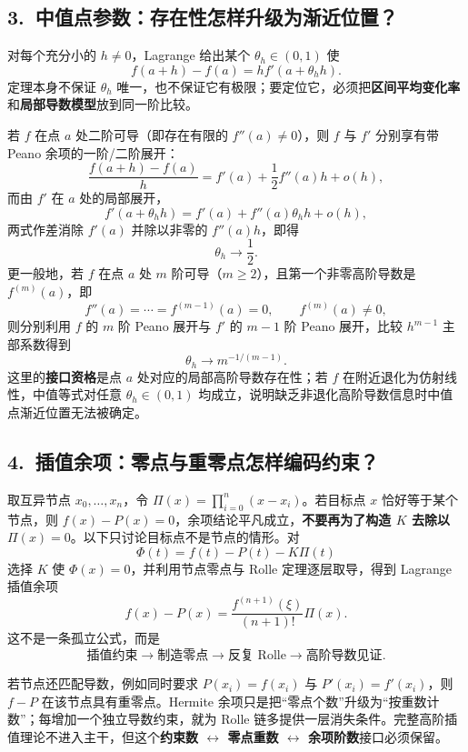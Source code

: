 \documentclass[UTF8,a4paper,10pt]{ctexart}
\begin{document}
\begin{center}

\end{center}

\subsection*{3.\ 中值点参数：存在性怎样升级为渐近位置？}
对每个充分小的 $h\ne0$，Lagrange 给出某个 $\theta_h\in(0,1)$ 使
\[
f(a+h)-f(a)=h f'(a+\theta_h h).
\]
定理本身不保证 $\theta_h$ 唯一，也不保证它有极限；要定位它，必须把\textbf{区间平均变化率}和\textbf{局部导数模型}放到同一阶比较。

若 $f$ 在点 $a$ 处二阶可导（即存在有限的 $f''(a)\ne0$），则 $f$ 与 $f'$ 分别享有带 Peano 余项的一阶/二阶展开：
\[
\frac{f(a+h)-f(a)}h=f'(a)+\frac12f''(a)h+o(h),
\]
而由 $f'$ 在 $a$ 处的局部展开，
\[
f'(a+\theta_hh)=f'(a)+f''(a)\theta_hh+o(h),
\]
两式作差消除 $f'(a)$ 并除以非零的 $f''(a)h$，即得
\[
\boxed{\theta_h\to\frac12}.
\]
更一般地，若 $f$ 在点 $a$ 处 $m$ 阶可导（$m\ge2$），且第一个非零高阶导数是 $f^{(m)}(a)$，即
\[
f''(a)=\cdots=f^{(m-1)}(a)=0,\qquad f^{(m)}(a)\ne0,
\]
则分别利用 $f$ 的 $m$ 阶 Peano 展开与 $f'$ 的 $m-1$ 阶 Peano 展开，比较 $h^{m-1}$ 主部系数得到
\[
\boxed{\theta_h\to m^{-1/(m-1)}}.
\]
这里的\textbf{接口资格}是点 $a$ 处对应的局部高阶导数存在性；若 $f$ 在附近退化为仿射线性，中值等式对任意 $\theta_h\in(0,1)$ 均成立，说明缺乏非退化高阶导数信息时中值点渐近位置无法被确定。

\subsection*{4.\ 插值余项：零点与重零点怎样编码约束？}
取互异节点 $x_0,\ldots,x_n$，令 $\Pi(x)=\prod_{i=0}^{n}(x-x_i)$。若目标点 $x$ 恰好等于某个节点，则 $f(x)-P(x)=0$，余项结论平凡成立，\textbf{不要再为了构造 $K$ 去除以 $\Pi(x)=0$}。以下只讨论目标点不是节点的情形。对
\[
\Phi(t)=f(t)-P(t)-K\Pi(t)
\]
选择 $K$ 使 $\Phi(x)=0$，并利用节点零点与 Rolle 定理逐层取导，得到 Lagrange 插值余项
\[
f(x)-P(x)=\frac{f^{(n+1)}(\xi)}{(n+1)!}\Pi(x).
\]
这不是一条孤立公式，而是
\[
\boxed{\text{插值约束}\to\text{制造零点}\to\text{反复 Rolle}\to\text{高阶导数见证}}.
\]

\begin{center}

\end{center}

若节点还匹配导数，例如同时要求 $P(x_i)=f(x_i)$ 与 $P'(x_i)=f'(x_i)$，则 $f-P$ 在该节点具有重零点。Hermite 余项只是把“零点个数”升级为“按重数计数”；每增加一个独立导数约束，就为 Rolle 链多提供一层消失条件。完整高阶插值理论不进入主干，但这个\textbf{约束数 $\leftrightarrow$ 零点重数 $\leftrightarrow$ 余项阶数}接口必须保留。
\end{document}
